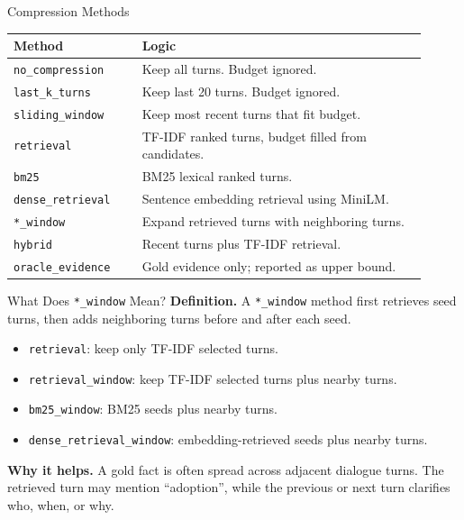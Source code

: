 \documentclass[aspectratio=169]{beamer}
\newcommand{\method}[1]{\texttt{#1}}
\newcommand{\metric}[1]{\textbf{#1}}
\begin{document}
\begin{frame}{Compression Methods}
\begin{tabular}{p{0.29\linewidth}p{0.62\linewidth}}
\toprule
Method & Logic \\
\midrule
\method{no\_compression} & Keep all turns. Budget ignored. \\
\method{last\_k\_turns} & Keep last 20 turns. Budget ignored. \\
\method{sliding\_window} & Keep most recent turns that fit budget. \\
\method{retrieval} & TF-IDF ranked turns, budget filled from candidates. \\
\method{bm25} & BM25 lexical ranked turns. \\
\method{dense\_retrieval} & Sentence embedding retrieval using MiniLM. \\
\method{*\_window} & Expand retrieved turns with neighboring turns. \\
\method{hybrid} & Recent turns plus TF-IDF retrieval. \\
\method{oracle\_evidence} & Gold evidence only; reported as upper bound. \\
\bottomrule
\end{tabular}
\end{frame}

\begin{frame}{What Does \method{*\_window} Mean?}
\metric{Definition.} A \method{*\_window} method first retrieves seed turns, then adds neighboring turns before and after each seed.

\vspace{0.5em}
\begin{itemize}
  \item \method{retrieval}: keep only TF-IDF selected turns.
  \item \method{retrieval\_window}: keep TF-IDF selected turns plus nearby turns.
  \item \method{bm25\_window}: BM25 seeds plus nearby turns.
  \item \method{dense\_retrieval\_window}: embedding-retrieved seeds plus nearby turns.
\end{itemize}

\vspace{0.5em}
\metric{Why it helps.} A gold fact is often spread across adjacent dialogue turns. The retrieved turn may mention ``adoption'', while the previous or next turn clarifies who, when, or why.
\end{frame}
\end{document}
